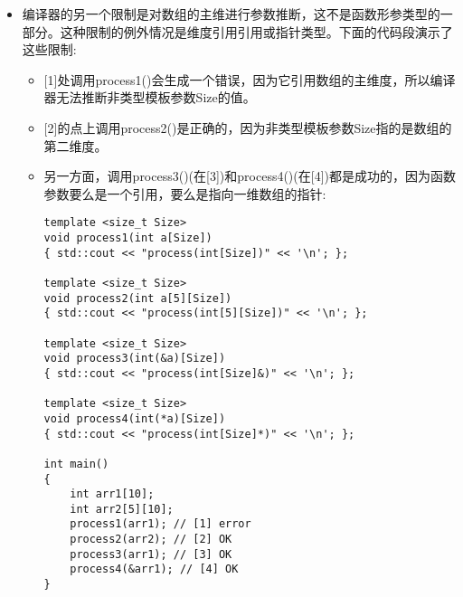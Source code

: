 \begin{itemize}
\begin{lstlisting}[style=styleCXX]
template <typename T>
void alpha(T, int)
{ std::cout << "alpha(T,int)" << '\n'; }

void beta(int, int)
{ std::cout << "beta(int,int)" << '\n'; }

void beta(short, int)
{ std::cout << "beta(short,int)" << '\n'; }

void gamma(short, int, long long)
{ std::cout << "gamma(short,int,long long)" << '\n'; }

void gamma(double, int)
{ std::cout << "gamma(double,int)" << '\n'; }

int main()
{
	invoke(&alpha); // [1] error
	invoke(&beta); // [2] error
	invoke(&gamma); // [3] OK
}
\end{lstlisting}

\item
编译器的另一个限制是对数组的主维进行参数推断，这不是函数形参类型的一部分。这种限制的例外情况是维度引用引用或指针类型。下面的代码段演示了这些限制:

\begin{itemize}
\item
{}[1]处调用process1()会生成一个错误，因为它引用数组的主维度，所以编译器无法推断非类型模板参数Size的值。

\item
{}[2]的点上调用process2()是正确的，因为非类型模板参数Size指的是数组的第二维度。

\item 
另一方面，调用process3()(在[3])和process4()(在[4])都是成功的，因为函数参数要么是一个引用，要么是指向一维数组的指针:

\begin{lstlisting}[style=styleCXX]
template <size_t Size>
void process1(int a[Size])
{ std::cout << "process(int[Size])" << '\n'; };

template <size_t Size>
void process2(int a[5][Size])
{ std::cout << "process(int[5][Size])" << '\n'; };

template <size_t Size>
void process3(int(&a)[Size])
{ std::cout << "process(int[Size]&)" << '\n'; };

template <size_t Size>
void process4(int(*a)[Size])
{ std::cout << "process(int[Size]*)" << '\n'; };

int main()
{
	int arr1[10];
	int arr2[5][10];
	process1(arr1); // [1] error
	process2(arr2); // [2] OK
	process3(arr1); // [3] OK
	process4(&arr1); // [4] OK
}
\end{lstlisting}

\end{itemize}


\end{itemize}
